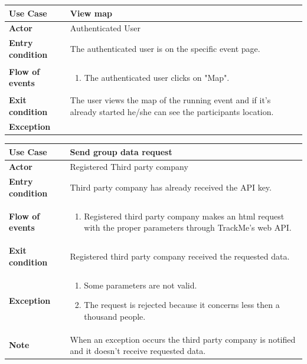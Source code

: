 \documentclass[../main.tex]{subfiles}
\begin{document}
	\vspace*{3cm}
	\begin{center}
		\begin{tabular}{p{3cm}p{8.28cm}}
			\hline
			\textbf{Use Case} & View map\\
			\hline
			\textbf{Actor} & Authenticated User\\
			\hline
			\textbf{Entry condition} & The authenticated user is on the specific event page.\\
			\hline
			\textbf{Flow of events} & \begin{enumerate}
				\linespread{0}\item The authenticated user clicks on "Map".
			\end{enumerate}\\
			\hline
			\textbf{Exit condition} & The user views the map of the running event and if it's already started he/she can see the participants location.\\
			\hline
			\textbf{Exception}\\
			\hline
		\end{tabular}
	\end{center}
	\vspace*{3cm}
	\begin{center}
		\begin{tabular}{p{3cm}p{8.28cm}}
			\hline
			\textbf{Use Case} & Send group data request\\
			\hline
			\textbf{Actor} & Registered Third party company\\
			\hline
			\textbf{Entry condition} & Third party company has already received the API key.\\
			\hline
			\textbf{Flow of events} & \begin{enumerate}
				\linespread{0}\item Registered third party company makes an html request with the proper parameters through TrackMe's web API.
			\end{enumerate}\\
			\hline
			\textbf{Exit condition} & Registered third party company received the requested data.\\
			\hline
			\textbf{Exception} & \begin{enumerate}
				\linespread{0}\item Some parameters are not valid.
				\linespread{0}\item The request is rejected because it concerns less then a thousand people.
			\end{enumerate}\\
			\hline
			\textbf{Note} & When an exception occurs the third party company is notified and it doesn't receive requested data. \\
			\hline
		\end{tabular}
	\end{center}
\end{document}
